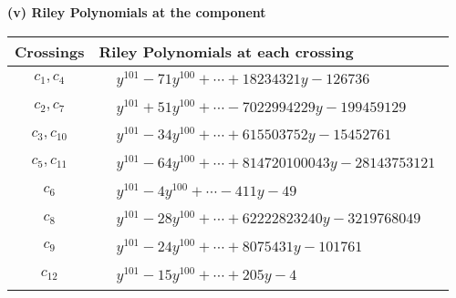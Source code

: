 \documentclass[1p]{elsarticle_modified}
\theoremstyle{definition}
\begin{document}
\newpage\renewcommand{\arraystretch}{1}
\flushleft \textbf{(v) Riley Polynomials at the component}\newline \\
\begin{tabular}{m{50pt}|m{274pt}}
Crossings & \hspace{64pt}Riley Polynomials at each crossing \\
\hline $$\begin{aligned}c_{1},c_{4}\end{aligned}$$&$\begin{aligned}
&y^{101}-71 y^{100}+\cdots+18234321 y-126736
\end{aligned}$\\
\hline $$\begin{aligned}c_{2},c_{7}\end{aligned}$$&$\begin{aligned}
&y^{101}+51 y^{100}+\cdots-7022994229 y-199459129
\end{aligned}$\\
\hline $$\begin{aligned}c_{3},c_{10}\end{aligned}$$&$\begin{aligned}
&y^{101}-34 y^{100}+\cdots+615503752 y-15452761
\end{aligned}$\\
\hline $$\begin{aligned}c_{5},c_{11}\end{aligned}$$&$\begin{aligned}
&y^{101}-64 y^{100}+\cdots+814720100043 y-28143753121
\end{aligned}$\\
\hline $$\begin{aligned}c_{6}\end{aligned}$$&$\begin{aligned}
&y^{101}-4 y^{100}+\cdots-411 y-49
\end{aligned}$\\
\hline $$\begin{aligned}c_{8}\end{aligned}$$&$\begin{aligned}
&y^{101}-28 y^{100}+\cdots+62222823240 y-3219768049
\end{aligned}$\\
\hline $$\begin{aligned}c_{9}\end{aligned}$$&$\begin{aligned}
&y^{101}-24 y^{100}+\cdots+8075431 y-101761
\end{aligned}$\\
\hline $$\begin{aligned}c_{12}\end{aligned}$$&$\begin{aligned}
&y^{101}-15 y^{100}+\cdots+205 y-4
\end{aligned}$\\
\hline
\end{tabular}\\~\\
\end{document}
